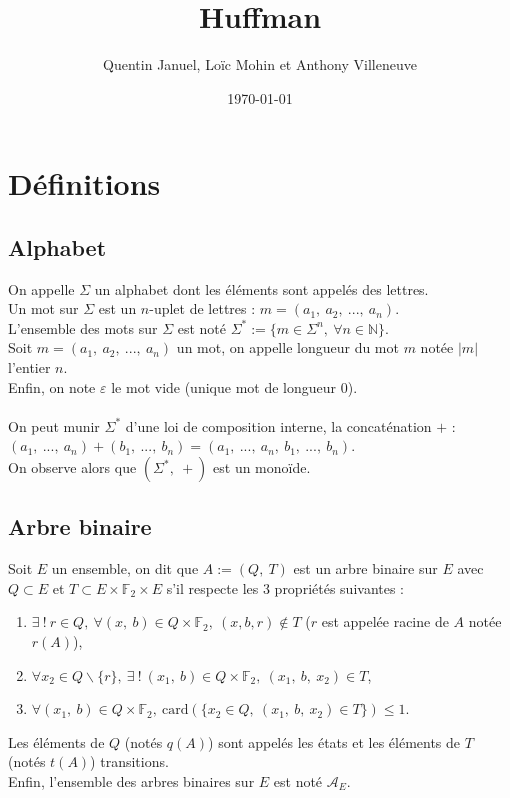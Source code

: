 \documentclass[a4paper, 12pt]{article}
\title{Huffman}
\author{Quentin Januel, Loïc Mohin et Anthony Villeneuve}
\date{\today}
\begin{document}
\maketitle
\newpage

\tableofcontents{}
\newpage

\section{Définitions}

\subsection{Alphabet}
On appelle $\Sigma$ un alphabet dont les éléments sont appelés des lettres. \\
Un mot sur $\Sigma$ est un $n$-uplet de lettres : $m = (a_1,\ a_2,\ ...,\ a_n)$. \\
L'ensemble des mots sur $\Sigma$ est noté $\Sigma^* := \{m \in \Sigma^n,\ \forall n \in \mathbb{N}\}$. \\
Soit $m = (a_1,\ a_2,\ ...,\ a_n)$ un mot, on appelle longueur du mot $m$ notée $|m|$ l'entier $n$. \\
Enfin, on note $\varepsilon$ le mot vide (unique mot de longueur $0$). \\ \\
On peut munir $\Sigma^*$ d'une loi de composition interne, la concaténation $+$ : \\
$(a_1,\ ...,\ a_n)+(b_1,\ ...,\ b_n) = (a_1,\ ...,\ a_n,\ b_1,\ ...,\ b_n)$. \\
On observe alors que $(\Sigma^*,\ +)$ est un monoïde.

\subsection{Arbre binaire}
Soit $E$ un ensemble, on dit que $A := (Q,\ T)$ est un arbre binaire sur $E$ avec $Q \subset E$ et $T \subset E\times \mathbb{F}_2\times E$ s'il respecte les 3 propriétés suivantes :
\begin{enumerate}
\item $\exists \ !\ r \in Q,\ \forall (x,\ b) \in Q\times \mathbb{F}_2,\ (x, b, r) \notin T$ ($r$ est appelée racine de $A$ notée $r(A)$),
\item $\forall x_2 \in Q\backslash\{r\},\ \exists \ !\ (x_1,\ b) \in Q\times \mathbb{F}_2,\ (x_1,\ b,\ x_2) \in T$, %
\item $\forall (x_1,\ b) \in Q\times \mathbb{F}_2,\ \text{card}(\{x_2 \in Q,\ (x_1,\ b,\ x_2)\in T\}) \leq 1$.
\end{enumerate}
Les éléments de $Q$ (notés $q(A)$) sont appelés les états et les éléments de $T$ (notés $t(A)$) transitions. \\
Enfin, l'ensemble des arbres binaires sur $E$ est noté $\mathcal{A}_E$.
\end{document}

